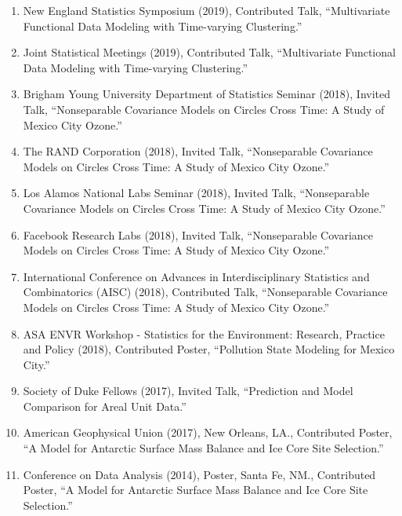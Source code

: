\documentclass[11pt]{article}
\begin{document}
\begin{enumerate}[label=$\bullet$]
\item New England Statistics Symposium (2019), Contributed Talk, ``Multivariate Functional Data Modeling with Time-varying Clustering.''
\item Joint Statistical Meetings (2019), Contributed Talk, ``Multivariate Functional Data Modeling with Time-varying Clustering.''

\item Brigham Young University Department of Statistics Seminar (2018), Invited Talk, ``Nonseparable Covariance Models on Circles Cross Time: A Study of Mexico City Ozone.''
\item The RAND Corporation (2018), Invited Talk, ``Nonseparable Covariance Models on Circles Cross Time: A Study of Mexico City Ozone.''
\item Los Alamos National Labs Seminar (2018), Invited Talk, ``Nonseparable Covariance Models on Circles Cross Time: A Study of Mexico City Ozone.''
\item Facebook Research Labs (2018), Invited Talk, ``Nonseparable Covariance Models on Circles Cross Time: A Study of Mexico City Ozone.''
\item International Conference on Advances in Interdisciplinary Statistics and Combinatorics (AISC) (2018), Contributed Talk, ``Nonseparable Covariance Models on Circles Cross Time: A Study of Mexico City Ozone.''
\item ASA ENVR Workshop - Statistics for the Environment: Research, Practice and Policy (2018), Contributed Poster, ``Pollution State Modeling for Mexico City.''

\item Society of Duke Fellows (2017), Invited Talk, ``Prediction and Model Comparison for Areal Unit Data.''
\item American Geophysical Union (2017), New Orleans, LA., Contributed Poster, ``A Model for Antarctic Surface Mass Balance and Ice Core Site Selection.'' 

\item Conference on Data Analysis (2014), Poster, Santa Fe, NM., Contributed Poster, ``A Model for Antarctic Surface Mass Balance and Ice Core Site Selection.'' 



\end{enumerate}
\end{document}
